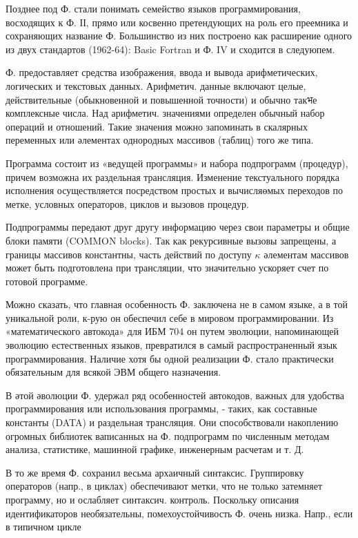 \documentclass[10pt]{article}
\begin{document}
Позднее под Ф. стали понимать семейство языков программирования, восходящих к Ф. ІІ, прямо или косвенно претендующих на роль его преемника и сохраняющих название Ф. Большинство из них построено как расширение одного из двух стандартов (1962-64): Basic Fortran и Ф. IV и сходится в следуюпем.



Ф. предоставляет средства изображения, ввода и вывода арифметических, логических и текстовых данных. Арифметич. данные включают целые, действительные (обыкновенной и повышенной точности) и обычно такभе комплексные числа. Над арифметич. значениями определен обычный набор операций и отношений. Такие значения можно запоминать в скалярных переменных или әлементах однородных массивов (таблиц) того же типа.



Программа состоит из «ведущей программы» и набора подпрограмм (процедур), причем возможна их раздельная трансляция. Изменение текстуального порядка исполнения осуществляется посредством простых и вычисляөмых переходов по метке, условных операторов, циклов и вызовов процедур.



Подпрограммы передают друг другу информацию через свои параметры и общие блоки памяти (COMMON blocks). Так как рекурсивные вызовы запрещены, а границы массивов константны, часть действий по доступу $\kappa$ әлементам массивов может быть подготовлена при трансляции, что значительно ускоряет счет по готовой программе.



Можно сказать, что главная особенность Ф. заключена не в самом языке, а в той уникальной роли, к-рую он обеспечил себе в мировом программировании. Из «математического автокода» для ИБМ 704 он путем эволюции, напоминающей эволюцию естественных языков, превратился в самый распространенный язык программирования. Наличие хотя бы одной реализации Ф. стало практически обязательным для всякой ЭВМ общего назначения.



В әтой әволюции Ф. удержал ряд особенностей автокодов, важных для удобства программирования или использования программы, - таких, как составные константы (DATA) и раздельная трансляция. Они способствовали накоплению огромных библиотек ваписанных на Ф. подпрограмм по численным методам анализа, статистике, машинной графике, инженерным расчетам и т. Д.



В то же время Ф. сохранил весьма архаичный синтаксис. Группировку операторов (напр., в циклах) обеспечивают метки, что не только затемняет программу, но и ослабляет синтаксич. контроль. Поскольку описания идентификаторов необязательны, помехоустойчивость Ф. очень низка. Напр., если в типичном цикле
\end{document}
